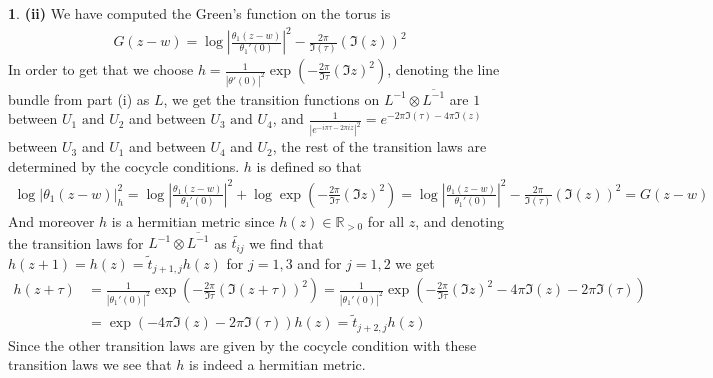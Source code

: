 \documentclass[10.5pt]{article}
\theoremstyle{definition}
\newtheorem{pb}{}
\newcommand{\abs}[1]{\left\vert#1\right\vert}
\newcommand{\tand}{\text{ and }}
\begin{document}
\begin{pb}
        \textbf{(ii)} We have computed the Green's function on the torus is
        \begin{align}
            G(z-w) = \log\abs{\frac{\theta_1(z-w)}{\theta_1'(0)}}^2 - \frac{2\pi}{\Im(\tau)}(\Im(z))^2
        \end{align}
        In order to get that we choose \(h = \frac{1}{\abs{\theta'(0)}^2}\exp(-\frac{2\pi}{\Im \tau}(\Im z)^2)\), denoting the line bundle from part (i) as \(L\), we get the transition functions on \(L^{-1}\otimes \overline{L^{-1}}\) are \(1\) between \(U_1 \tand U_2\) and between \(U_3 \tand U_4\), and \(\frac{1}{\abs{e^{-i\pi \tau - 2\pi i z}}^2} = e^{-2\pi \Im(\tau) - 4\pi \Im(z)}\) between \(U_3\) and \(U_1\) and between \(U_4\) and \(U_2\), the rest of the transition laws are determined by the cocycle conditions. \(h\) is defined so that 
        \begin{align}
            \log\abs{\theta_1(z-w)}^2_h = \log\abs{\frac{\theta_1(z-w)}{\theta_1'(0)}}^2 + \log \exp(-\frac{2\pi}{\Im \tau}(\Im z)^2) = \log\abs{\frac{\theta_1(z-w)}{\theta_1'(0)}}^2 - \frac{2\pi}{\Im(\tau)}(\Im(z))^2 = G(z-w)
        \end{align}
        And moreover \(h\) is a hermitian metric since \(h(z) \in \mathbb{R}_{>0}\) for all \(z\), and denoting the transition laws for \(L^{-1}\otimes \overline{L^{-1}}\) as \(\widetilde{t_{ij}}\) we find that \(h(z+1) = h(z) = \widetilde{t}_{j+1,j}h(z)\) for \(j = 1,3\) and for \(j = 1,2\) we get
        \begin{align}
            h(z+\tau) &= \frac{1}{\abs{\theta_1'(0)}^2}\exp(-\frac{2\pi}{\Im \tau}(\Im (z + \tau))^2) = \frac{1}{\abs{\theta_1'(0)}^2}\exp(-\frac{2\pi}{\Im\tau}(\Im z)^2 - 4\pi \Im(z) - 2\pi \Im(\tau)) \\
            &=\exp(-4\pi \Im(z) - 2\pi\Im(\tau))h(z) = \tilde{t}_{j+2,j}h(z)
        \end{align}
        Since the other transition laws are given by the cocycle condition with these transition laws we see that \(h\) is indeed a hermitian metric.


\end{pb}
\end{document}
